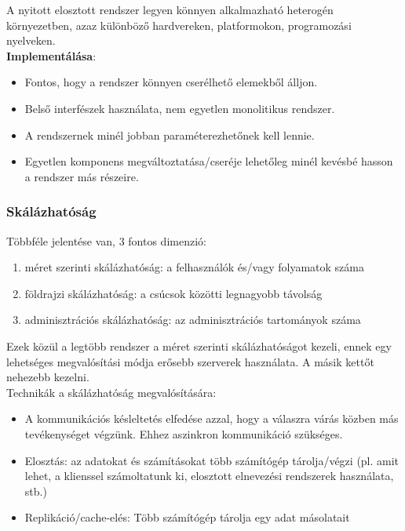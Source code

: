 \documentclass[12pt]{article}
\begin{document}
	\noindent A nyitott elosztott rendszer legyen könnyen alkalmazható heterogén környezetben, azaz
	különböző hardvereken, platformokon, programozási nyelveken.\\
	
	\noindent \textbf{Implementálása}:
	
	\begin{itemize}
		\item	Fontos, hogy a rendszer könnyen cserélhető elemekből álljon.
		\item	Belső interfészek használata, nem egyetlen monolitikus rendszer.
		\item	A rendszernek minél jobban paraméterezhetőnek kell lennie.
		\item	Egyetlen komponens megváltoztatása/cseréje lehetőleg minél kevésbé
		hasson a rendszer más részeire.
	\end{itemize}
	
	\subsubsection{Skálázhatóság}
	
	Többféle jelentése van, 3 fontos dimenzió:
	
	\begin{enumerate}
		\item	méret szerinti skálázhatóság: a felhasználók és/vagy folyamatok száma
		\item	földrajzi skálázhatóság: a csúcsok közötti legnagyobb távolság
		\item	adminisztrációs skálázhatóság: az adminisztrációs tartományok száma
	\end{enumerate}
	
	\noindent Ezek közül a legtöbb rendszer a méret szerinti skálázhatóságot kezeli, ennek egy lehetséges megvalósítási
	módja erősebb szerverek használata. A másik kettőt nehezebb kezelni.\\
\newpage	
	\noindent Technikák a skálázhatóság megvalósítására:
	
	\begin{itemize}
		\item	A kommunikációs késleltetés elfedése azzal, hogy a válaszra várás közben más tevékenységet végzünk. Ehhez
		aszinkron kommunikáció szükséges.
		
		\item	Elosztás: az adatokat és számításokat több számítógép tárolja/végzi (pl. amit lehet, a klienssel számoltatunk ki,
		elosztott elnevezési rendszerek használata, stb.)
		
		\item	Replikáció/cache-elés:  Több számítógép tárolja egy adat másolatait
	\end{itemize}
	
\end{document}
